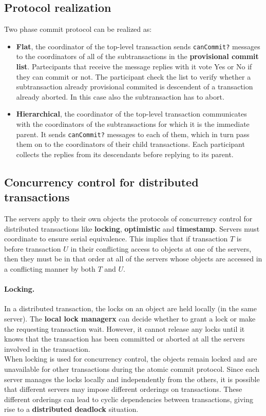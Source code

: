 \subsection{Protocol realization}

Two phase commit protocol can be realized as:
\begin{itemize}
	\item \textbf{Flat}, the coordinator of the top-level transaction sends \verb|canCommit?| messages to the coordinators of all of the subtransactions in the \textbf{provisional commit list}. Partecipants that receive the message replies with it vote Yes or No if they can commit or not. The participant check the list to verify whether a subtransaction already provisional commited is descendent of a transaction already aborted. In this case also the subtransaction has to abort.
	
	
	
	\item \textbf{Hierarchical}, the coordinator of the top-level transaction communicates with the coordinators of the subtransactions for which it is the immediate parent. It sends \verb|canCommit?| messages to each of them, which in turn pass them on to the coordinators of their child transactions. Each participant collects the replies from its descendants before replying to its parent.
\end{itemize}


\subsection{Concurrency control for distributed transactions}
The servers apply to their own objects the protocols of concurrency control for
distributed transactions like \textbf{locking}, \textbf{optimistic} and \textbf{timestamp}. Servers must coordinate to ensure serial equivalence. This implies that if transaction $T$ is before transaction $U$ in their conflicting access to objects at one of the servers, then they must be in that order at all of the servers whose objects are accessed in a conflicting manner by both $T$ and $U$.

\paragraph*{Locking.} In a distributed transaction, the locks on an object are held locally (in the same server). The \textbf{local lock managerx} can decide whether to grant a lock or make the requesting transaction wait. However, it cannot release any locks until it knows that the transaction has been committed or aborted at all the servers involved in the transaction.\\
When locking is used for concurrency control, the objects remain locked and are unavailable for other transactions during the atomic commit protocol. Since each server manages the locks locally and independently from the others, it is possible that different servers may impose different orderings on transactions. These different orderings can lead to cyclic dependencies between transactions, giving rise to a \textbf{distributed deadlock} situation.

